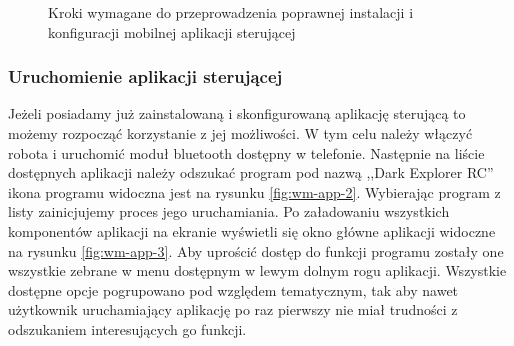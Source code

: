 \begin{figure}[h!]
 \caption{Kroki wymagane do przeprowadzenia poprawnej instalacji i konfiguracji mobilnej aplikacji sterującej}
 \label{fig:wm-install&conf}
\end{figure}

\subsubsection{Uruchomienie aplikacji sterującej}
Jeżeli posiadamy już zainstalowaną i skonfigurowaną aplikację sterującą to
możemy rozpocząć korzystanie z jej możliwości. W tym celu należy włączyć robota
i uruchomić moduł bluetooth dostępny w telefonie. Następnie na liście dostępnych
aplikacji należy odszukać program pod nazwą ,,Dark Explorer RC'' ikona programu
widoczna jest na rysunku \ref{fig:wm-app-2}. Wybierając program z listy
zainicjujemy proces jego uruchamiania. Po załadowaniu wszystkich komponentów
aplikacji na ekranie wyświetli się okno główne aplikacji widoczne na rysunku
\ref{fig:wm-app-3}. Aby uprościć dostęp do funkcji programu zostały one
wszystkie zebrane w menu dostępnym w lewym dolnym rogu aplikacji. Wszystkie
dostępne opcje pogrupowano pod względem tematycznym, tak aby nawet użytkownik
uruchamiający aplikację po raz pierwszy nie miał trudności z odszukaniem
interesujących go funkcji. 

